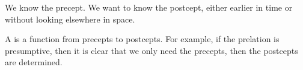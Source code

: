 

We know the precept.
We want to know the postcept,
either earlier in time
or without looking elsewhere
in space.


A  is a function from
precepts to postcepts.
For example,
if the prelation is presumptive,
then it is clear that we only
need the precepts, then the postcepts
are determined.

